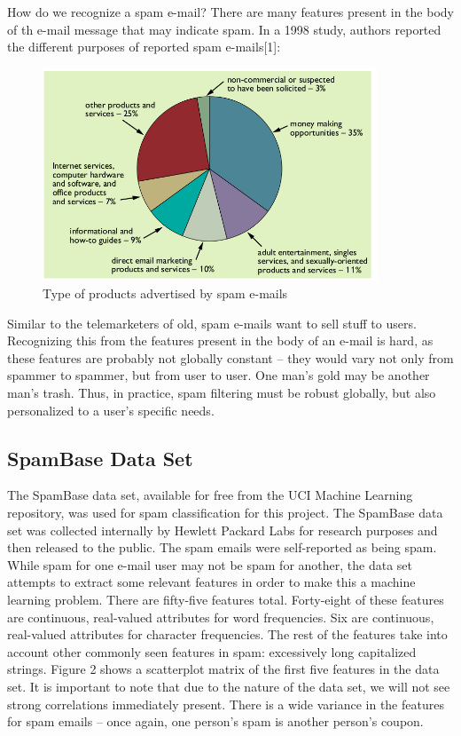\documentclass[a4paper,10pt]{article}
\begin{document}
How do we recognize a spam e-mail? There are many features present in the body of th e-mail message that may
indicate spam. In a 1998 study, authors reported the different purposes of reported spam e-mails[1]:

 \begin{figure}[h]
 \centering
 \includegraphics[width=100mm]{../resources/spam-pi-chart.png}
 \caption{Type of products advertised by spam e-mails}
\end{figure}

Similar to the telemarketers of old, spam e-mails want to sell stuff to users. Recognizing this from the features
present in the body of an e-mail is hard, as these features are probably not globally constant -- they would vary
not only from spammer to spammer, but from user to user. One man's gold may be another man's trash. Thus, in practice,
spam filtering must be robust globally, but also personalized to a user's specific needs.

\subsection{SpamBase Data Set}

The SpamBase data set, available for free from the UCI Machine Learning repository, was used for spam classification
for this project. The SpamBase data set was collected internally by Hewlett Packard Labs for research purposes and
then released to the public. The spam emails were self-reported as being spam. While spam for one e-mail user may
not be spam for another, the data set attempts to extract some relevant features in order to make this a machine
learning problem. There are fifty-five features total. Forty-eight of these features are continuous, real-valued
attributes for word frequencies. Six are continuous, real-valued attributes for character frequencies. The rest 
of the features take into account other commonly seen features in spam: excessively long capitalized strings. Figure 2
shows a scatterplot matrix of the first five features in the data set. It is important to note that due to the nature
of the data set, we will not see strong correlations immediately present. There is a wide variance in the features for
spam emails -- once again, one person's spam is another person's coupon.
\end{document}
